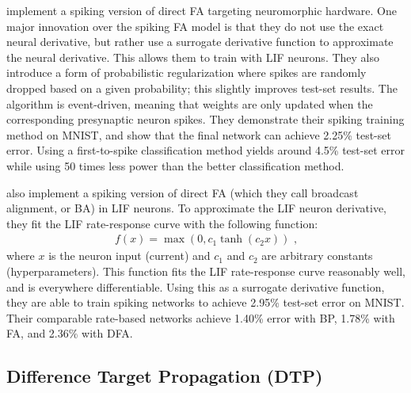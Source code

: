 \textcite{Neftci2017} implement a spiking version of direct FA
targeting neuromorphic hardware.
One major innovation over the \textcite{Lillicrap2016} spiking FA model
is that they do not use the exact neural derivative,
but rather use a surrogate derivative function
to approximate the neural derivative.
This allows them to train with LIF neurons.
They also introduce a form of probabilistic regularization
where spikes are randomly dropped based on a given probability;
this slightly improves test-set results.
The algorithm is event-driven,
meaning that weights are only updated when the corresponding presynaptic neuron spikes.
They demonstrate their spiking training method on MNIST,
and show that the final network can achieve 2.25\% test-set error.
Using a first-to-spike classification method yields around 4.5\% test-set error
while using 50 times less power than the better classification method.

\textcite{Samadi2017} also implement a spiking version of direct FA
(which they call broadcast alignment, or BA) in LIF neurons.
To approximate the LIF neuron derivative,
they fit the LIF rate-response curve with the following function:
\begin{align}
  f(x) = \max(0, c_1 \tanh(c_2 x)) \text{ ,}
\end{align}
where $x$ is the neuron input (current)
and $c_1$ and $c_2$ are arbitrary constants (hyperparameters).
This function fits the LIF rate-response curve reasonably well,
and is everywhere differentiable.
Using this as a surrogate derivative function,
they are able to train spiking networks to achieve 2.95\% test-set error on MNIST.
Their comparable rate-based networks achieve
1.40\% error with BP, 1.78\% with FA, and 2.36\% with DFA.


\subsection{Difference Target Propagation (DTP)}

\newcommand{\vh}{\vect{h}}

